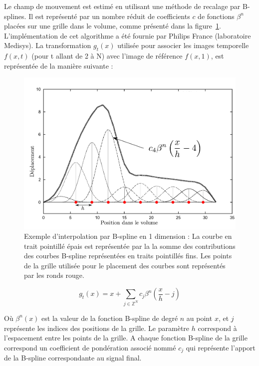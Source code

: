 Le champ de mouvement est estimé en utilisant une méthode de recalage par B-splines. Il est représenté par un nombre réduit de coefficients $c$ de fonctions $\beta^n$ placées sur une grille dans le volume, comme présenté dans la figure~\ref{fig:Bspline}. L'implémentation de cet algorithme a été fournie par Philips France (laboratoire Medisys). La transformation $g_t(x)$ utilisée pour associer les images temporelle  $f(x,t)$ (pour t allant de 2 à N) avec l'image de référence $f(x,1)$, est représentée de la manière suivante :

\begin{figure}
\centering
\includegraphics[width=17cm]{images/Bspline}
\caption[Exemple d'interpolation par B-spline]{Exemple d'interpolation par B-spline en 1 dimension : La courbe en trait pointillé épais est représentée par la la somme des contributions des courbes B-spline représentées en traits pointillés fins. Les points de la grille utilisée pour le placement des courbes sont représentés par les ronds rouge.}
\label{fig:Bspline}
\end{figure}


\begin{equation}
  g_t(x)=x + \sum\limits_{j\in \mathbb{Z}^N} c_j \beta^n \left( \frac{x}{h}-j \right)
\end{equation}

Où $\beta^n(x)$ est la valeur de la fonction B-spline de degré $n$ au point $x$, et $j$ représente les indices des positions de la grille. Le paramètre $h$ correspond à l'espacement entre les points de la grille. A chaque fonction B-spline de la grille correspond un coefficient de pondération associé nommé $c_j$ qui représente l'apport de la B-spline correspondante au signal final.

